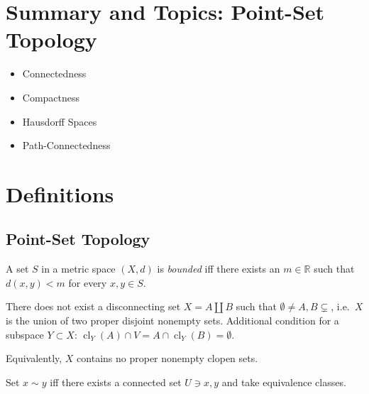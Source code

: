 \hypertarget{summary-and-topics-point-set-topology}{%
\section{Summary and Topics: Point-Set
Topology}\label{summary-and-topics-point-set-topology}}

\begin{itemize}
\tightlist
\item
  Connectedness
\item
  Compactness
\item
  Hausdorff Spaces
\item
  Path-Connectedness
\end{itemize}

\hypertarget{definitions}{%
\section{Definitions}\label{definitions}}

\hypertarget{point-set-topology}{%
\subsection{Point-Set Topology}\label{point-set-topology}}

\begin{definition}[Bounded]

A set \(S\) in a metric space \((X, d)\) is \emph{bounded} iff there
exists an \(m\in {\mathbb{R}}\) such that \(d(x, y) < m\) for every
\(x, y\in S\).

\end{definition}

\begin{definition}[Connected]

There does not exist a disconnecting set \(X = A{\coprod}B\) such that
\(\emptyset \neq A, B \subsetneq\), i.e.~\(X\) is the union of two
proper disjoint nonempty sets. Additional condition for a subspace
\(Y\subset X\):
\(\operatorname{cl}_{Y}(A) \cap V = A \cap\operatorname{cl}_{Y}(B) = \emptyset\).

Equivalently, \(X\) contains no proper nonempty clopen sets.

\end{definition}

\begin{definition}

Set \(x\sim y\) iff there exists a connected set \(U\ni x, y\) and take
equivalence classes.

\end{definition}

